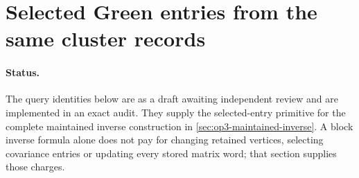 \section[Selected Green entries]{Selected Green entries from the same cluster records}
\label{sec:op3-cluster-green}

\paragraph{Status.}
The query identities below are \statusproved{} as a draft awaiting
independent review and are implemented in an exact audit. They supply the
selected-entry primitive for the complete maintained inverse construction
in \cref{sec:op3-maintained-inverse}. A block inverse formula alone does
not pay for changing retained vertices, selecting covariance entries or
updating every stored matrix word; that section supplies those charges.

